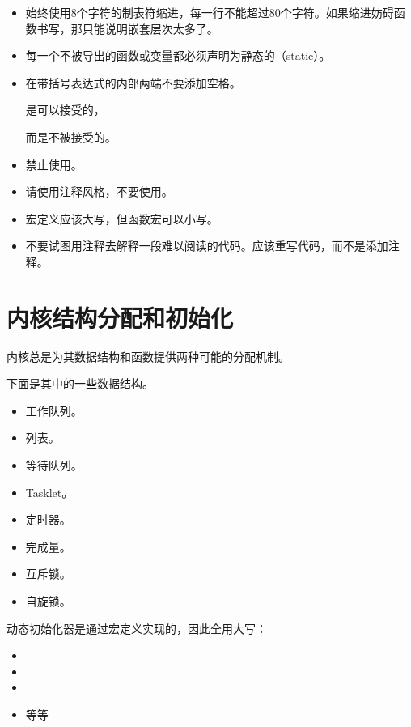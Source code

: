 \documentclass[lang=cn,newtx,10pt,scheme=chinese]{elegantbook}
\begin{document}
\begin{itemize}
    \item 始终使用8个字符的制表符缩进，每一行不能超过80个字符。如果缩进妨碍函数书写，那只能说明嵌套层次太多了。
    \item 每一个不被导出的函数或变量都必须声明为静态的（static）。
    \item 在带括号表达式的内部两端不要添加空格。
    
    是可以接受的，
    
    而是不被接受的。
    \item 禁止使用。
    \item 请使用注释风格，不要使用。
    \item 宏定义应该大写，但函数宏可以小写。
    \item 不要试图用注释去解释一段难以阅读的代码。应该重写代码，而不是添加注释。
\end{itemize}

\section{内核结构分配和初始化}

内核总是为其数据结构和函数提供两种可能的分配机制。

下面是其中的一些数据结构。

\begin{itemize}
\item 工作队列。
\item 列表。
\item 等待队列。
\item Tasklet。
\item 定时器。
\item 完成量。
\item 互斥锁。
\item 自旋锁。
\end{itemize}

动态初始化器是通过宏定义实现的，因此全用大写：

\begin{itemize}
    \item {}
    \item {}
    \item {}
    \item 等等
\end{itemize}
\end{document}
